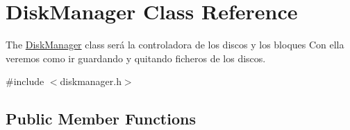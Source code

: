 \hypertarget{classDiskManager}{}\section{Disk\+Manager Class Reference}
\label{classDiskManager}


The \hyperlink{classDiskManager}{Disk\+Manager} class será la controladora de los discos y los bloques Con ella veremos como ir guardando y quitando ficheros de los discos.  




{\ttfamily \#include $<$diskmanager.\+h$>$}

\subsection*{Public Member Functions}
